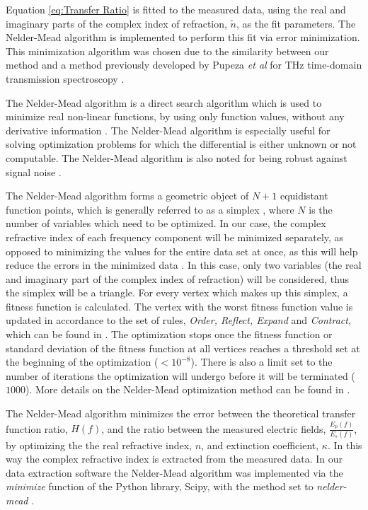 Equation \ref{eq:Transfer Ratio} is fitted to the measured data, using the real and imaginary parts of the complex index of refraction, $\widetilde{n}$, as the fit parameters. The Nelder-Mead algorithm is implemented to perform this fit via error minimization. This minimization algorithm was chosen due to the similarity between our method and a method previously developed by Pupeza \textit{et al} for THz time-domain transmission spectroscopy \cite{Pupeza2007}.

The Nelder-Mead algorithm is a direct search algorithm which is used to minimize real non-linear functions, by using only function values, without any derivative information \cite{Lagarias1998}. The Nelder-Mead algorithm is especially useful for solving optimization problems for which the differential is either unknown or not computable. The Nelder-Mead algorithm is also noted for being robust against signal noise \cite{Hejase2012}.

The Nelder-Mead algorithm forms a geometric object of $N+1$ equidistant function points, which is generally referred to as a simplex \cite{Simp2020}, where $N$ is the number of variables which need to be optimized. In our case, the complex refractive index of each frequency component will be minimized separately, as opposed to minimizing the values for the entire data set at once, as this will help reduce the errors in the minimized data \cite{Hejase2012}. In this case, only two variables (the real and imaginary part of the complex index of refraction) will be considered, thus the simplex will be a triangle. For every vertex which makes up this simplex, a fitness function is calculated. The vertex with the worst fitness function value is updated in accordance to the set of rules, \textit{Order, Reflect, Expand} and \textit{Contract}, which can be found in \cite{Lagarias1998}. The optimization stops once the fitness function or standard deviation of the fitness function at all vertices reaches a threshold set at the beginning of the optimization ($<10^{-8}$). There is also a limit set to the number of iterations the optimization will undergo before it will be terminated ($1000$). More details on the Nelder-Mead optimization method can be found in \cite{Lagarias1998,Hejase2012}.

The Nelder-Mead algorithm minimizes the error between the theoretical transfer function ratio, $H(f)$, and the ratio between the measured electric fields, $\frac{E_{p}(f)}{E_{s}(f)}$, by optimizing the the real refractive index, $n$, and extinction coefficient, $\kappa$. In this way the complex refractive index is extracted from the measured data. In our data extraction software the Nelder-Mead algorithm was implemented via the \textit{minimize} function of the Python library, Scipy, with the method set to \textit{nelder-mead} \cite{Sci2019}.

